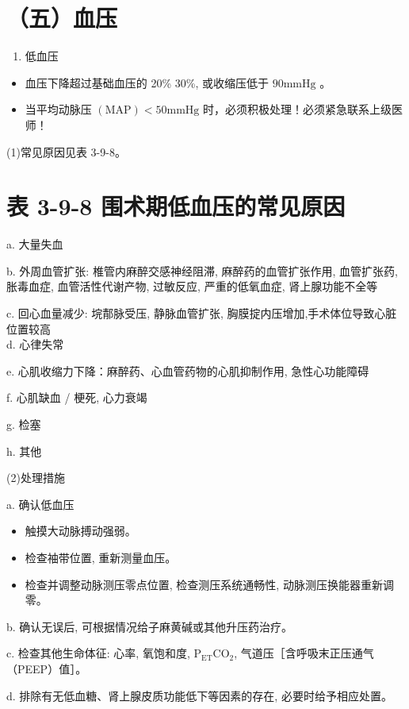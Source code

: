 \documentclass[10pt]{article}
\begin{document}
\section*{（五）血压}
\begin{enumerate}
  \item 低血压
\end{enumerate}

\begin{itemize}
  \item 血压下降超过基础血压的 20\% 30\%, 或收缩压低于 $90 \mathrm{mmHg}$ 。
  \item 当平均动脉压 $(\mathrm{MAP})<50 \mathrm{mmHg}$ 时，必须积极处理！必须紧急联系上级医师！
\end{itemize}

(1)常见原因见表 3-9-8。

\section*{表 3-9-8 围术期低血压的常见原因}
a. 大量失血

b. 外周血管扩张: 椎管内麻醉交感神经阻滞, 麻醉药的血管扩张作用, 血管扩张药, 胀毒血症, 血管活性代谢产物, 过敏反应, 严重的低氧血症, 肾上腺功能不全等

c. 回心血量减少: 垸郬脉受压, 静脉血管扩张, 胸膜掟内压增加,手术体位导致心脏位置较高\\
d. 心律失常

e. 心肌收缩力下降：麻醉药、心血管药物的心肌抑制作用, 急性心功能障碍

f. 心肌缺血 / 梗死, 心力衰竭

g. 检塞

h. 其他

(2)处理措施

a. 确认低血压

\begin{itemize}
  \item 触摸大动脉搏动强弱。
  \item 检查袖带位置, 重新测量血压。
  \item 检查并调整动脉测压零点位置, 检查测压系统通畅性, 动脉测压换能器重新调零。
\end{itemize}

b. 确认无误后, 可根据情况给子麻黄碱或其他升压药治疗。

c. 检查其他生命体征: 心率, 氧饱和度, $\mathrm{P}_{\mathrm{ET}} \mathrm{CO}_{2}$, 气道压［含呼吸末正压通气（PEEP）值］。

d. 排除有无低血糖、肾上腺皮质功能低下等因素的存在, 必要时给予相应处置。
\end{document}
